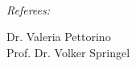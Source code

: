 \documentclass[
11pt, %
german, english,%
singlespacing, %
headsepline, %
]{MastersDoctoralThesis} %
\begin{document}
\begin{titlepage}
	\begin{center}
		
				{\large \bfseries \ttitle}\\[0.4cm] %
		\vfill 
				\begin{minipage}{0.6\textwidth}
					\begin{flushleft} \large
						\emph{Referees:}\\
					\end{flushleft}
				\end{minipage}
				\begin{minipage}{0.6\textwidth}
					\begin{flushright} \large
						Dr. Valeria Pettorino \\
						Prof. Dr. Volker Springel \\
					\end{flushright}
				\end{minipage}\\[1cm]
		
		
		
	\end{center}
\end{titlepage}
\end{document}
